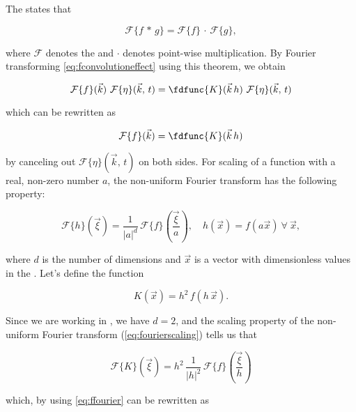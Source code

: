 The  states that

\begin{equation} \label{eq:convolutiontheorem}
\mathcal{F}\{f\,*\,g\} = \mathcal{F}\{f\}\,\cdot\,\mathcal{F}\{g\},
\end{equation}

where $\mathcal{F}$ denotes the  and $\cdot$ denotes point-wise multiplication. By Fourier transforming \eqref{eq:fconvolutioneffect} using this theorem, we obtain

\begin{equation}
\mathcal{F}\{f\}(\vec{k})\ \mathcal{F}\{\eta\}(\vec{k},\,t) = \fdfunc{K}(\vec{k}\,h)\ \mathcal{F}\{\eta\}(\vec{k},\,t)
\end{equation}

which can be rewritten as

\begin{equation} \label{eq:ffourier}
\mathcal{F}\{f\}(\vec{k}) = \fdfunc{K}(\vec{k}\,h)
\end{equation}

by canceling out $\mathcal{F}\{\eta\}(\vec{k},\,t)$ on both sides. For scaling of a function with a real, non-zero number $a$, the non-uniform Fourier transform has the following property:

\begin{equation} \label{eq:fourierscaling}
\mathcal{F}\{h\}(\vec{\xi}) = \frac{1}{|a|^d}\,\mathcal{F}\{f\}\left(\frac{\vec{\xi}}{a}\right)
,\quad
h(\vec{x}) = f(a\vec{x})\ \forall\ \vec{x},
\end{equation}

where $d$ is the number of dimensions and $\vec{x}$ is a vector with dimensionless values in the . Let's define the function

\begin{equation} \label{eq:ftokernel}
K(\vec{x}) = h^2\,f(h\,\vec{x}).
\end{equation}

Since we are working in , we have $d = 2$, and the scaling property of the non-uniform Fourier transform (\eqref{eq:fourierscaling}) tells us that

\begin{equation}
\mathcal{F}\{K\}(\vec{\xi}) = h^2\,\frac{1}{|h|^2}\,\mathcal{F}\{f\}\left(\frac{\vec{\xi}}{h}\right)
\end{equation}

which, by using \eqref{eq:ffourier} can be rewritten as

